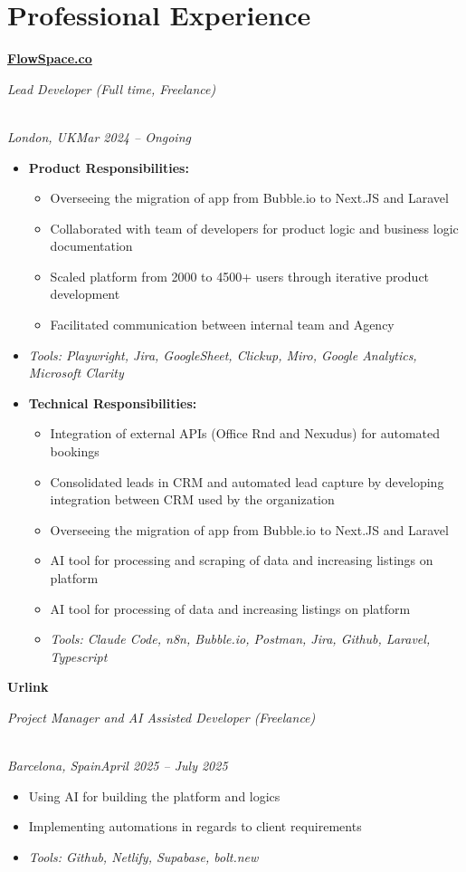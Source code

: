 \documentclass[a4paper,10pt]{article}
\newcommand{\role}[4]{\vspace{3pt}\noindent\hspace{0.6em}\parbox[t]{0.38\textwidth}{\raggedright\textbf{#1}}\hfill\parbox[t]{0.58\textwidth}{\raggedleft\textit{#2}}\\{\textit{#3}\hfill\textit{#4}}\vspace{1pt}}
\begin{document}
\section{Professional Experience}
\role{\href{https://flowspace.co}{FlowSpace.co}}{Lead Developer (Full time, Freelance)}{London, UK}{Mar 2024 -- Ongoing}
\begin{itemize}
\item \textbf{Product Responsibilities:}
\begin{itemize}[label=--]
\item Overseeing the migration of app from Bubble.io to Next.JS and Laravel
\item Collaborated with team of developers for product logic and business logic documentation
\item Scaled platform from 2000 to 4500+ users through iterative product development
\item Facilitated communication between internal team and Agency
\end{itemize}
\item \textit{Tools: Playwright, Jira, GoogleSheet, Clickup, Miro, Google Analytics, Microsoft Clarity}
\item \textbf{Technical Responsibilities:}
\begin{itemize}[label=--]
\item Integration of external APIs (Office Rnd and Nexudus) for automated bookings
\item Consolidated leads in CRM and automated lead capture by developing integration between CRM used by the organization
\item Overseeing the migration of app from Bubble.io to Next.JS and Laravel
\item AI tool for processing and scraping of data and increasing listings on platform
\item AI tool for processing of data and increasing listings on platform
\item \textit{Tools: Claude Code, n8n, Bubble.io, Postman, Jira, Github, Laravel, Typescript}
\end{itemize}
\end{itemize}

\role{Urlink}{Project Manager and AI Assisted Developer (Freelance)}{Barcelona, Spain}{April 2025 -- July 2025}
\begin{itemize}
\item Using AI for building the platform and logics
\item Implementing automations in regards to client requirements
\item \textit{Tools: Github, Netlify, Supabase, bolt.new}
\end{itemize}
\end{document}
